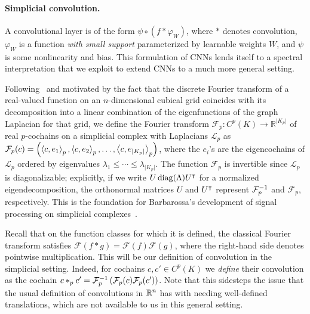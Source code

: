 \paragraph{Simplicial convolution.}

A convolutional layer is of the form $\psi\circ(f\ast \varphi_W)$, where $\ast$ denotes convolution, $\varphi_W$ is a function
\emph{with small support} parameterized by learnable weights $W$, and $\psi$ is some nonlinearity and bias. This formulation of CNNs lends itself to a spectral interpretation that we exploit to extend CNNs to a much more general setting.

Following~\cite{defferrard2016convolutional} and motivated by the fact that the discrete Fourier transform of a real-valued function on an $n$-dimensional cubical grid coincides with its decomposition into a linear combination of the eigenfunctions of the graph Laplacian for that grid, we define the Fourier transform $\mathcal{F}_p: C^p(K) \to \mathbb{R}^{\lvert K_p \rvert}$ of real $p$-cochains on a simplicial complex with Laplacians $\mathcal{L}_p$ as $\mathcal{F}_p(c) = \left(\left\langle c , e_1 \right\rangle_p, \left\langle c , e_2 \right\rangle_p, \dotsc, \left\langle c , e_{\lvert K_p \rvert} \right\rangle_p\right)$, where the $e_i$'s are the eigencochains of $\mathcal{L}_p$ ordered by eigenvalues $\lambda_1\leq\dotsm\leq\lambda_{\lvert K_p \rvert}$. The function $\mathcal{F}_p$ is invertible since $\mathcal{L}_p$ is diagonalizable; explicitly, if we write $U\operatorname{diag}(\Lambda)U^{\intercal}$ for a normalized eigendecomposition, the orthonormal matrices $U$ and $U^{\intercal}$ represent $\mathcal{F}^{-1}_p$ and $\mathcal{F}_p$, respectively. This is the foundation for Barbarossa's development of signal processing on simplicial complexes~\cite{barbarossa2018learning}.

Recall that on the function classes for which it is defined, the classical Fourier transform satisfies $\mathcal{F}(f\ast g)=\mathcal{F}(f)\mathcal{F}(g)$, where the right-hand side denotes pointwise multiplication. This will be our definition of convolution in the simplicial setting. Indeed, for cochains $c,c'\in C^p(K)$ we \emph{define} their convolution as the cochain $c\ast_p c' = \mathcal{F}_p^{-1}\left(\mathcal{F}_p(c)\mathcal{F}_p(c')\right)$. Note that this sidesteps the issue that the usual definition of convolutions in $\mathbb{R}^n$ has with needing well-defined translations, which are not available to us in this general setting.

